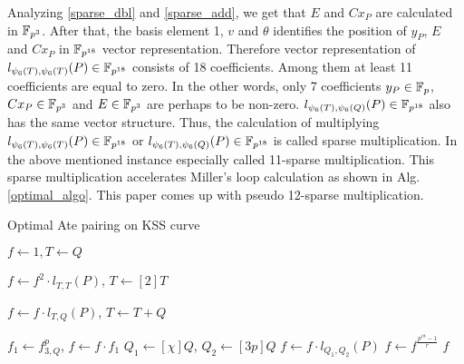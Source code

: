 Analyzing \eqref{sparse_dbl} and \eqref{sparse_add}, we get that  $E$ and $Cx_P$ are calculated in $\mathbb{F}_{p^3}$. After that, the basis element 1, $v$ and $\theta$ identifies the position of $y_P$, $E$ and $Cx_P$ in $\mathbb{F}_{p^{18}}$ vector representation. Therefore vector representation of $l_{\psi_6(T),\psi_6(T)}(P)\in \mathbb{F}_{p^{18}}$ consists of 18 coefficients. Among them at least 11 coefficients are equal to zero. In the other words, only 7 coefficients $y_P\in {\mathbb{F}}_{p}$, $Cx_P\in \mathbb{F}_{p^{3}}$ and $E\in \mathbb{F}_{p^{3}}$ are perhaps to be non-zero.
$l_{\psi_6(T),\psi_6(Q)}(P)\in \mathbb{F}_{p^{18}}$ also has the same vector structure. Thus, the calculation of multiplying $l_{\psi_6(T),\psi_6(T)}(P)\in \mathbb{F}_{p^{18}}$ or $l_{\psi_6(T),\psi_6(Q)}(P)\in \mathbb{F}_{p^{18}}$ is called sparse multiplication. In the above mentioned instance especially called 11-sparse multiplication. This sparse multiplication accelerates Miller's loop calculation as shown in Alg. \ref{optimal_algo}. This paper comes up with pseudo 12-sparse multiplication.
%
%
\begin{algorithm}[htbp]
	\caption{Optimal Ate pairing on KSS curve}
	\label{optimal_algo}
	\DontPrintSemicolon

	\hspace{-3ex}
	\hspace{-3ex}
	\nl $f \leftarrow 1,T \leftarrow Q$\;
	\nl {} {
	\nl $f\leftarrow f^2\cdot l_{T,T}(P)$, $T\leftarrow [2]T$\;

	\nl {} {
	\nl $f\leftarrow f\cdot l_{T,Q}(P)$, $T\leftarrow T+Q$}}

	\nl $f_1\leftarrow f_{3,Q}^p$, $f\leftarrow f\cdot f_1$\;
	\nl $Q_1\leftarrow [\chi]Q$, $Q_2\leftarrow [3p]Q$\;
	\nl $f\leftarrow f\cdot l_{Q_1,Q_2}(P)$\;
	\nl $f\leftarrow f^{\frac{p^{18}-1}{r}}$\;
	 $f$\;
\end{algorithm}
\vspace{-0.6em}


